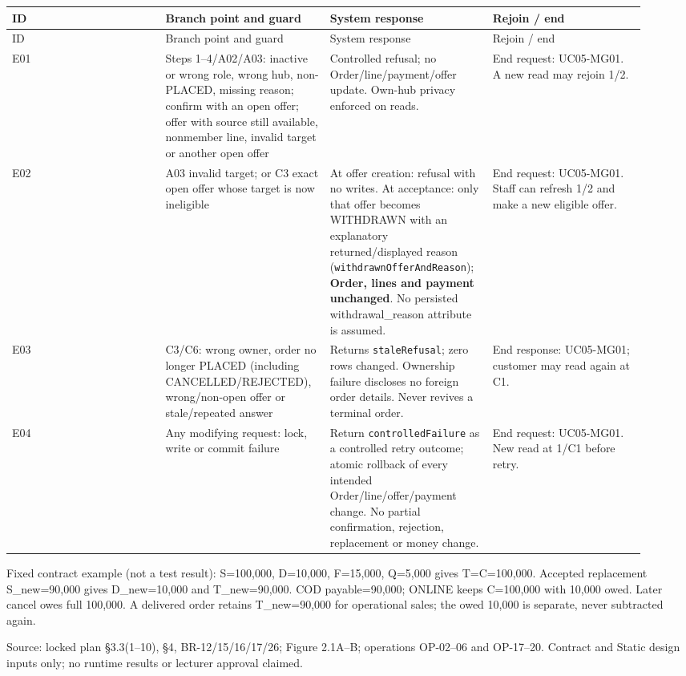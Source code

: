 \begin{longtable}{>{\raggedright\arraybackslash}p{0.2300\linewidth}>{\raggedright\arraybackslash}p{0.2300\linewidth}>{\raggedright\arraybackslash}p{0.2300\linewidth}>{\raggedright\arraybackslash}p{0.2300\linewidth}}
ID & Branch point and guard & System response & Rejoin / end \\
\hline\endfirsthead
ID & Branch point and guard & System response & Rejoin / end \\
\hline\endhead
E01 & Steps 1--4/A02/A03: inactive or wrong role, wrong hub, non-PLACED, missing reason; confirm with an open offer; offer with source still available, nonmember line, invalid target or another open offer & Controlled refusal; no Order/line/payment/offer update. Own-hub privacy enforced on reads. & End request: UC05-MG01. A new read may rejoin 1/2. \\
E02 & A03 invalid target; or C3 exact open offer whose target is now ineligible & At offer creation: refusal with no writes. At acceptance: only that offer becomes WITHDRAWN with an explanatory returned/displayed reason (\texttt{withdrawnOfferAndReason}); \textbf{Order, lines and payment unchanged}. No persisted withdrawal\_reason attribute is assumed. & End request: UC05-MG01. Staff can refresh 1/2 and make a new eligible offer. \\
E03 & C3/C6: wrong owner, order no longer PLACED (including CANCELLED/REJECTED), wrong/non-open offer or stale/repeated answer & Returns \texttt{staleRefusal}; zero rows changed. Ownership failure discloses no foreign order details. Never revives a terminal order. & End response: UC05-MG01; customer may read again at C1. \\
E04 & Any modifying request: lock, write or commit failure & Return \texttt{controlledFailure} as a controlled retry outcome; atomic rollback of every intended Order/line/offer/payment change. No partial confirmation, rejection, replacement or money change. & End request: UC05-MG01. New read at 1/C1 before retry. \\
\end{longtable}
Fixed contract example (not a test result): S=100,000, D=10,000, F=15,000, Q=5,000 gives T=C=100,000. Accepted replacement S\_new=90,000 gives D\_new=10,000 and T\_new=90,000. COD payable=90,000; ONLINE keeps C=100,000 with 10,000 owed. Later cancel owes full 100,000. A delivered order retains T\_new=90,000 for operational sales; the owed 10,000 is separate, never subtracted again.

Source: locked plan \S{}3.3(1--10), \S{}4, BR-12/15/16/17/26; Figure 2.1A--B; operations OP-02--06 and OP-17--20. Contract and Static design inputs only; no runtime results or lecturer approval claimed.
